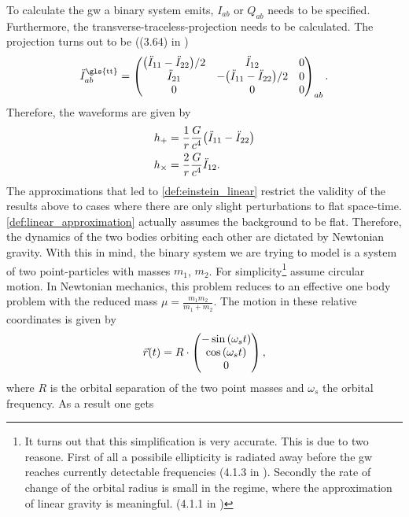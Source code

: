 \noindent To calculate the \gls{gw} a binary system emits, $I_{ab}$ or $Q_{ab}$ needs to be specified. Furthermore, the transverse-traceless-projection needs to be calculated. The projection turns out to be ((3.64) in \cite{gwv1})
\begin{equation}
\ddot{I}_{ab}^\text{\gls{tt}}=
\begin{pmatrix}
\lr{\ddot{I}_{11}-\ddot{I}_{22}}/2 & \ddot{I}_{12}                     & 0\\
\ddot{I}_{21}                      & -\lr{\ddot{I}_{11}-\ddot{I}_{22}}/2 & 0\\
0                                  & 0                                 & 0
\end{pmatrix}_{ab}.
\end{equation}
Therefore, the waveforms are given by
\begin{align}
h_+ & = \frac{1}{r}\frac{G}{c^4}{\left( \ddot{I}_{11}-\ddot{I}_{22} \right)}\\
h_\times & = \frac{2}{r}\frac{G}{c^4}\ddot{I}_{12}.
\end{align}
The approximations that led to \eqref{def:einstein_linear} restrict the validity of the results above to cases where there are only slight perturbations to flat space-time. \eqref{def:linear_approximation} actually assumes the background to be flat. Therefore, the dynamics of the two bodies orbiting each other are dictated by Newtonian gravity. With this in mind, the binary system we are trying to model is a system of two point-particles with masses $m_1$, $m_2$. For simplicity\footnote{It turns out that this simplification is very accurate. This is due to two reasone. First of all a possibile ellipticity is radiated away before the \gls{gw} reaches currently detectable frequencies (4.1.3 in \cite{gwv1}). Secondly the rate of change of the orbital radius is small in the regime, where the approximation of linear gravity is meaningful. (4.1.1 in \cite{gwv1})} assume circular motion. In Newtonian mechanics, this problem reduces to an effective one body problem with the reduced mass $\mu=\frac{m_1m_2}{m_1+m_2}$. The motion in these relative coordinates is given by
\begin{equation}\label{def:binary_motion}
\vec{r}{\left( t \right)} = R\cdot
\begin{pmatrix}
	-\sin{\left( \omega_s t \right)}\\
	\cos{\left( \omega_s t \right)}\\
	0
\end{pmatrix},
\end{equation}
where $R$ is the orbital separation of the two point masses and $\omega_s$ the orbital frequency. As a result one gets
